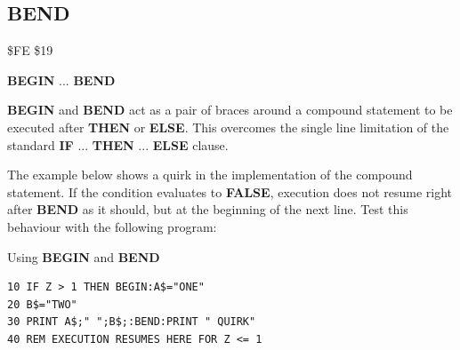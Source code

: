 \subsection{BEND}
\begin{description}[leftmargin=2cm,style=nextline]
\item [Token:] \$FE \$19
\item [Format:] {\bf BEGIN} ... {\bf BEND}
\item [Usage:] {\bf BEGIN} and {\bf BEND} act as
               a pair of braces around a compound statement
               to be executed after {\bf THEN} or {\bf ELSE}.
               This overcomes the single line limitation of the
               standard {\bf IF} ... {\bf THEN} ... {\bf ELSE} clause.
\item [Remarks:] The example below shows a quirk in the implementation
                 of the compound statement.
                 If the condition evaluates to {\bf FALSE}, execution
                 does not resume right after {\bf BEND} as it should,
                 but at the beginning of the next line.
                 Test this behaviour with the following program:
\item [Example:] Using {\bf BEGIN} and {\bf BEND}
\begin{tcolorbox}[colback=black,coltext=white]
\verbatimfont{\codefont}
\begin{verbatim}
10 IF Z > 1 THEN BEGIN:A$="ONE"
20 B$="TWO"
30 PRINT A$;" ";B$;:BEND:PRINT " QUIRK"
40 REM EXECUTION RESUMES HERE FOR Z <= 1
\end{verbatim}
\end{tcolorbox}
\end{description}


\newpage

